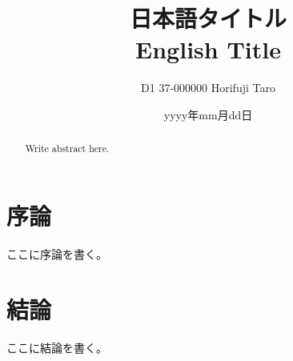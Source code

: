 \documentclass[10pt,a4paper,oneside,twocolumn,fleqn,dvipdfmx]{jsarticle}
\date{yyyy年mm月dd日}
\title{日本語タイトル\\ English Title}
\author{D1 37-000000 Horifuji Taro}
\affiliation{Hori \& Fujimoto Laboratory\\Department of Electrical Engineering}
\makeatletter
\newcommand{\eeistitle}{
    \twocolumn[
        \centering{
            \framebox[\linewidth]{
                \parbox{\linewidth-2ex}{
                \@documentname\hfill\@date
                \begin{center}
                    \Large{\bf{\@title}}
                \end{center}
                \@affiliation \hfill \@author
                }
            }
        }
        \vskip 2ex
        \ifvoid\@abstractbox\else\centerline{\box\@abstractbox}
    ]
}
\makeatother
\begin{document}
\begin{abstract}
Write abstract here.
\end{abstract}

\eeistitle %

\section{序論}
ここに序論を書く。

\section{結論}
ここに結論を書く。


\end{document}
